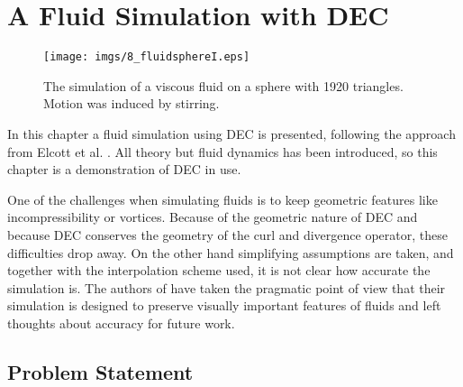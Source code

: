 \chapter{A Fluid Simulation with DEC}
\label{chap:FS}

\begin{figure}[h]%
\begin{center}
\texttt{[image: imgs/8\_fluidsphereI.eps]}%
\end{center}
\caption{The simulation of a viscous fluid on a sphere with 1920 triangles. Motion was induced by stirring.}%
\label{fig:8_fluidsphere}%
\end{figure}

In this chapter a fluid simulation using DEC is presented, following the approach from Elcott et al. \cite{simplicialFluids}. 
All theory but fluid dynamics has been introduced, so this chapter is a demonstration of DEC in use. 

One of the challenges when simulating fluids is to keep geometric features like incompressibility or vortices. Because of the geometric nature of DEC and because DEC conserves the geometry of the curl and divergence operator, these difficulties drop away. On the other hand simplifying assumptions are taken, and together with the interpolation scheme used, it is not clear how accurate the simulation is. The authors of \cite{simplicialFluids} have taken the pragmatic point of view that their simulation is designed to preserve visually important features of fluids and left thoughts about accuracy for future work. 


\section{Problem Statement}



